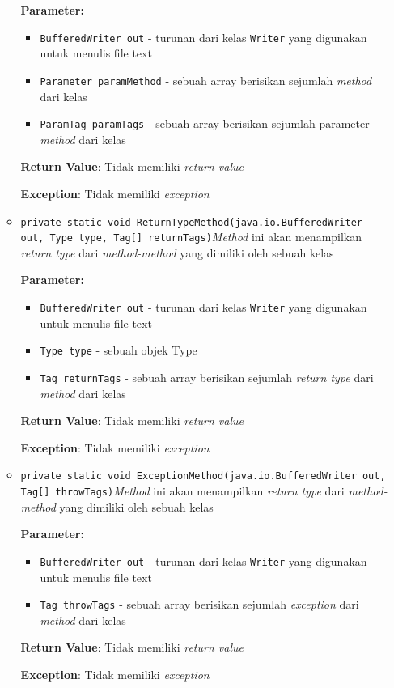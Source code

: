 \documentclass{article}
\begin{document}
\begin{enumerate}
\begin{itemize}
\textbf{Parameter:}
\begin{itemize}
\item \texttt{BufferedWriter out} - 
turunan dari kelas \texttt{Writer} yang digunakan untuk menulis file text
\item \texttt{Parameter paramMethod} - 
sebuah array berisikan sejumlah \textit{method} dari kelas
\item \texttt{ParamTag paramTags} - 
sebuah array berisikan sejumlah parameter \textit{method} dari kelas
\end{itemize}
\textbf{Return Value}: Tidak memiliki \textit{return value}

\textbf{Exception}: Tidak memiliki \textit{exception}

\item \texttt{private static void ReturnTypeMethod(java.io.BufferedWriter out, Type type, Tag[] returnTags)}\textit{Method} ini akan menampilkan \textit{return type} dari \textit{method-method} yang dimiliki
 oleh sebuah kelas

\textbf{Parameter:}
\begin{itemize}
\item \texttt{BufferedWriter out} - 
turunan dari kelas \texttt{Writer} yang digunakan untuk menulis file text
\item \texttt{Type type} - 
sebuah objek Type
\item \texttt{Tag returnTags} - 
sebuah array berisikan sejumlah \textit{return type} dari \textit{method} dari kelas
\end{itemize}
\textbf{Return Value}: Tidak memiliki \textit{return value}

\textbf{Exception}: Tidak memiliki \textit{exception}

\item \texttt{private static void ExceptionMethod(java.io.BufferedWriter out, Tag[] throwTags)}\textit{Method} ini akan menampilkan \textit{return type} dari \textit{method-method} yang dimiliki
 oleh sebuah kelas

\textbf{Parameter:}
\begin{itemize}
\item \texttt{BufferedWriter out} - 
turunan dari kelas \texttt{Writer} yang digunakan untuk menulis file text
\item \texttt{Tag throwTags} - 
sebuah array berisikan sejumlah \textit{exception} dari \textit{method} dari kelas
\end{itemize}
\textbf{Return Value}: Tidak memiliki \textit{return value}

\textbf{Exception}: Tidak memiliki \textit{exception}

\end{itemize}
\end{enumerate}
\end{document}
